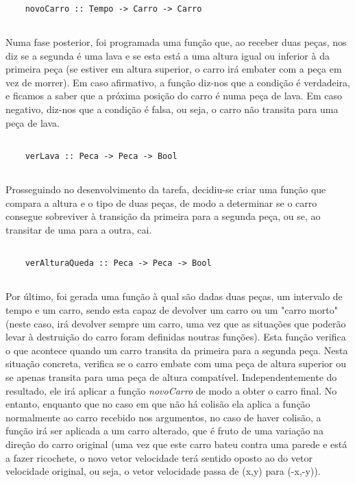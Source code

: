 \documentclass[a4paper]{report} %
\begin{document}
  \begin{verbatim}
    
    novoCarro :: Tempo -> Carro -> Carro
    
  \end{verbatim}

  \par \noindent Numa fase posterior, foi programada uma função que, ao receber duas peças, nos diz se a segunda é uma lava e se esta está a uma altura igual ou inferior à da primeira peça (se estiver em altura superior, o carro irá embater com a peça em vez de morrer). Em caso afirmativo, a função diz-nos que a condição é verdadeira, e ficamos a saber que a próxima posição do carro é numa peça de lava. Em caso negativo, diz-nos que a condição é falsa, ou seja, o carro não transita para uma peça de lava. 

  \begin{verbatim}
    
    verLava :: Peca -> Peca -> Bool
    
  \end{verbatim}

  \par \noindent Prosseguindo no desenvolvimento da tarefa, decidiu-se criar uma função que compara a altura e o tipo de duas peças, de modo a determinar se o carro consegue sobreviver à transição da primeira para a segunda peça, ou se, ao transitar de uma para a outra, cai.

  \begin{verbatim}
    
    verAlturaQueda :: Peca -> Peca -> Bool
    
  \end{verbatim}
  
  \newpage

  \par \noindent Por último, foi gerada uma função à qual são dadas duas peças, um intervalo de tempo e um carro, sendo esta capaz de devolver um carro ou um "carro morto" (neste caso, irá devolver sempre um carro, uma vez que as situações que poderão levar à destruição do carro foram definidas noutras funções). Esta função verifica o que acontece quando um carro transita da primeira para a segunda peça. Nesta situação concreta, verifica se o carro embate com uma peça de altura superior ou se apenas transita para uma peça de altura compatível. Independentemente do resultado, ele irá aplicar a função \textit{novoCarro} de modo a obter o carro final. No entanto, enquanto que no caso em que não há colisão ela aplica a função normalmente ao carro recebido nos argumentos, no caso de haver colisão, a função irá ser aplicada a um carro alterado, que é fruto de uma variação na direção do carro original (uma vez que este carro bateu contra uma parede e está a fazer ricochete, o novo vetor velocidade terá sentido oposto ao do vetor velocidade original, ou seja, o vetor velocidade passa de (x,y) para (-x,-y)).
\end{document}
